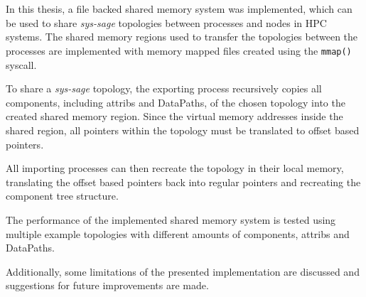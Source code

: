 \chapter{\abstractname}

In this thesis, a file backed shared memory system was implemented, which can be used to share \emph{sys-sage} topologies between processes and nodes in HPC systems.
The shared memory regions used to transfer the topologies between the processes are implemented with memory mapped files created using the \lstinline|mmap()| syscall.

To share a \emph{sys-sage} topology, the exporting process recursively copies all components, including attribs and DataPaths, of the chosen topology into the created shared memory region.
Since the virtual memory addresses inside the shared region, all pointers within the topology must be translated to offset based pointers.

All importing processes can then recreate the topology in their local memory, translating the offset based pointers back into regular pointers and recreating the component tree structure.

The performance of the implemented shared memory system is tested using multiple example topologies with different amounts of components, attribs and DataPaths.

Additionally, some limitations of the presented implementation are discussed and suggestions for future improvements are made.